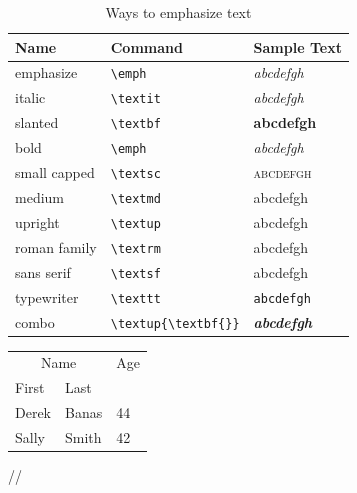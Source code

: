 \documentclass[a4paper,12pt]{book}
\begin{document}
\begin{table}
 
 
\begin{tabular}{l|l|l}
 
 
 
 
\hline
 
 
\textbf{Name} & \textbf{Command} & \textbf{Sample Text} \\
\hline
 
emphasize & \verb|\emph| & \emph{abcdefgh} \\
italic & \verb|\textit| & \textit{abcdefgh} \\
slanted & \verb|\textbf| & \textbf{abcdefgh} \\
bold & \verb|\emph| & \emph{abcdefgh} \\
small capped & \verb|\textsc| & \textsc{abcdefgh} \\
medium & \verb|\textmd| & \textmd{abcdefgh} \\
upright & \verb|\textup| & \textup{abcdefgh} \\
roman family & \verb|\textrm| & \textrm{abcdefgh} \\
sans serif & \verb|\textsf| & \textsf{abcdefgh} \\
typewriter & \verb|\texttt| & \texttt{abcdefgh} \\
combo & \verb|\textup{\textbf{}}| & \textit{\textbf{abcdefgh}} \\
\end{tabular}
\caption{Ways to emphasize text}
\end{table}
 
 
 
\begin{tabular}{@{}*3l@{}}
 
 
\multicolumn{2}{c}{Name} &
\multicolumn{1}{c}{Age}\\
 
 
First & Last & \\
\hline
Derek & Banas & 44\\
Sally & Smith & 42\\
\end{tabular}//
 
\end{document}
